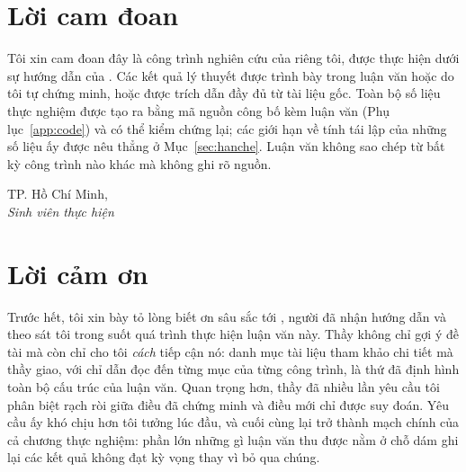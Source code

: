 
\chapter*{Lời cam đoan}

Tôi xin cam đoan đây là công trình nghiên cứu của riêng tôi, được thực hiện dưới
sự hướng dẫn của \thesisAdvisor. Các kết quả lý thuyết được trình bày trong luận
văn hoặc do tôi tự chứng minh, hoặc được trích dẫn đầy đủ từ tài liệu gốc. Toàn
bộ số liệu thực nghiệm được tạo ra bằng mã nguồn công bố kèm luận văn
(Phụ lục~\ref{app:code}) và có thể kiểm chứng lại; các giới hạn về tính tái lập
của những số liệu ấy được nêu thẳng ở Mục~\ref{sec:hanche}. Luận văn không sao
chép từ bất kỳ công trình nào khác mà không ghi rõ nguồn.

\vspace{1.5cm}
\begin{flushright}
\begin{minipage}{8.6cm}
\centering
TP. Hồ Chí Minh, \\[0.3cm]
\textit{Sinh viên thực hiện}\\[2cm]
\thesisAuthor
\end{minipage}
\end{flushright}

\chapter*{Lời cảm ơn}

Trước hết, tôi xin bày tỏ lòng biết ơn sâu sắc tới \thesisAdvisor{}, người đã
nhận hướng dẫn và theo sát tôi trong suốt quá trình thực hiện luận văn này. Thầy
không chỉ gợi ý đề tài mà còn chỉ cho tôi \emph{cách} tiếp cận nó: danh mục tài
liệu tham khảo chi tiết mà thầy giao, với chỉ dẫn đọc đến từng mục của từng công
trình, là thứ đã định hình toàn bộ cấu trúc của luận văn. Quan trọng hơn, thầy
đã nhiều lần yêu cầu tôi phân biệt rạch ròi giữa điều đã chứng minh và điều mới
chỉ được suy đoán. Yêu cầu ấy khó chịu hơn tôi tưởng lúc đầu, và cuối cùng lại
trở thành mạch chính của cả chương thực nghiệm: phần lớn những gì luận văn thu
được nằm ở chỗ dám ghi lại các kết quả không đạt kỳ vọng thay vì bỏ qua chúng.


